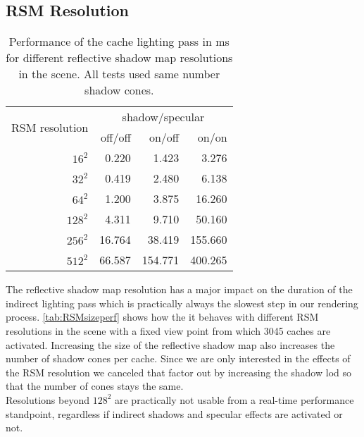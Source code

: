 \documentclass[thesis.tex]{subfiles}
\begin{document}
\subsection{RSM Resolution}
\begin{table}[h]
  \centering
    \begin{tabular}{r|rrr}
    \toprule
    \multirow{2}{*}{RSM resolution} & \multicolumn{3}{c}{ shadow/specular}\\
     & off/off & on/off & on/on \\
    \midrule
    $16^2$    & 0.220 & 1.423 & 3.276 \\
    $32^2$    & 0.419 & 2.480 & 6.138 \\
    $64^2$    & 1.200 & 3.875 & 16.260 \\
    $128^2$   & 4.311 & 9.710 & 50.160 \\
    $256^2$   & 16.764 & 38.419 & 155.660 \\
    $512^2$   & 66.587 & 154.771 & 400.265 \\
    \bottomrule
    \end{tabular}
\caption{Performance of the cache lighting pass in ms for different reflective shadow map resolutions in the  scene. All tests used same number shadow cones. }
\label{tab:RSMsizeperf}
\end{table}
The reflective shadow map resolution has a major impact on the duration of the indirect lighting pass which is practically always the slowest step in our rendering process.
\autoref{tab:RSMsizeperf} shows how the it behaves with different RSM resolutions in the  scene with a fixed view point from which 3045 caches are activated. %
Increasing the size of the reflective shadow map also increases the number of shadow cones per cache.
Since we are only interested in the effects of the RSM resolution we canceled that factor out by increasing the shadow lod so that the number of cones stays the same.
\\
Resolutions beyond $128^2$ are practically not usable from a real-time performance standpoint, regardless if indirect shadows and specular effects are activated or not.
\end{document}

